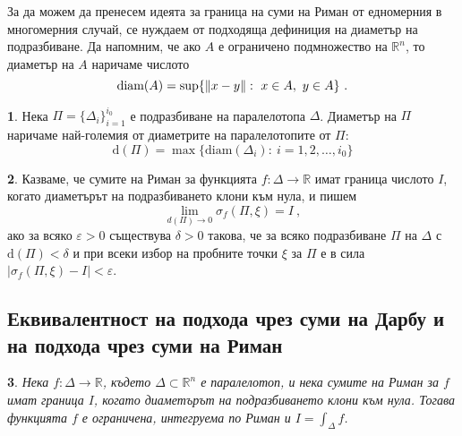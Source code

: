 \documentclass[11pt]{article}
\numberwithin{equation}{section}
\numberwithin{figure}{section}
\numberwithin{table}{section}
\theoremstyle{plain}
\newtheorem{thm}{\protect\theoremname}[section]
\theoremstyle{definition}
\newtheorem{defn}[thm]{\protect\definitionname}
\theoremstyle{remark}
\theoremstyle{definition}
\theoremstyle{remark}
\theoremstyle{plain}
\theoremstyle{definition}
\theoremstyle{definition}
\theoremstyle{plain}
\theoremstyle{plain}
\theoremstyle{plain}
\theoremstyle{definition}
\theoremstyle{plain}
\providecommand{\definitionname}{Дефиниция}
\providecommand{\theoremname}{Теорема}
\DeclarePairedDelimiter\norm{\lVert}{\rVert}
\newcommand*{\R}{\mathbb{R}}
\begin{document}
За да можем да пренесем идеята за граница на суми на Риман от едномерния в многомерния случай, се нуждаем от подходяща дефиниция на диаметър на подразбиване. Да напомним, че ако $A$ е ограничено подмножество на $\R^n$, то
диаметър на $A$ наричаме числото
 $$\textrm{diam}(A) = \sup\{\norm{x-y}:\ x\in A, \ y\in A\} \ .$$


\begin{defn} Нека $\Pi = \{\Delta_i \}_{i=1}^{i_0}$ е подразбиване на паралелотопа $\Delta$. Диаметър на $\Pi$ наричаме най-големия от диаметрите на паралелотопите от $\Pi$:
$$\textrm{d}(\Pi) = \max\{\textrm{diam}(\Delta_i) : \  i=1,2,\dots ,i_0\}$$
\end{defn}

\begin{defn}
Казваме, че сумите на Риман за функцията $f:\Delta \rightarrow \R$ имат граница числото $I$, когато диаметърът на подразбиването клони към нула, и пишем
$$\lim_{d(\Pi)\rightarrow 0} \sigma_f(\Pi, \xi)=I \ ,$$
 ако за всяко $\varepsilon >0$ съществува $\delta >0$ такова, че за всяко подразбиване $\Pi$ на $\Delta$ с $\textrm{d}(\Pi)<\delta$ и при всеки избор на пробните точки $\xi$ за $\Pi$ е в сила $\left| \sigma_f(\Pi ,\xi )-I\right| <\varepsilon$.
\end{defn}

\subsection{Еквивалентност на подхода чрез суми на Дарбу и на подхода чрез суми на Риман}

\begin{thm}\label{easy_equivalence}
Нека $f:\Delta\rightarrow\R$, където $\Delta \subset \R^n$ е паралелотоп, и нека сумите на Риман за $f$ имат граница $I$, когато диаметърът на подразбиването клони към нула. Тогава функцията $f$ е ограничена, интегруема по Риман и $I = \int_\Delta f$.
\end{thm}
\end{document}
